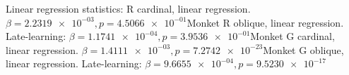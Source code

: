 Linear regression statistics: \nMonket R cardinal, linear regression. 
$\beta = \num{2.2319e-03}, p = \num{4.5066e-01}$Monket R oblique, linear regression. 
Late-learning: $\beta = \num{1.1741e-04}, p = \num{3.9536e-01}$Monket G cardinal, linear regression. 
$\beta = \num{1.4111e-03}, p = \num{7.2742e-23}$Monket G oblique, linear regression. 
Late-learning: $\beta = \num{9.6655e-04}, p = \num{9.5230e-17}$